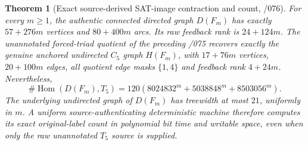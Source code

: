 \documentclass[11pt]{article}
\newtheorem{theorem}{Theorem}
\begin{document}
\begin{theorem}[Exact source-derived SAT-image contraction and count, /076]
For every $m\ge1$, the authentic connected directed graph $D(F_m)$
has exactly $57+276m$ vertices and $80+400m$ arcs.
Its raw feedback rank is $24+124m$.
The unannotated forced-triad quotient of the preceding /075
recovers exactly the genuine anchored undirected $C_5$ graph
$H(F_m)$, with $17+76m$ vertices, $20+100m$ edges,
all quotient edge masks $\{1,4\}$ and feedback rank $4+24m$.
Nevertheless,
\[
 \boxed{
 \#\operatorname{Hom}(D(F_m),T_5)
 =120\left(8024832^m+5038848^m+8503056^m\right).}
\]
The underlying undirected graph of $D(F_m)$ has treewidth at most
$21$, uniformly in $m$. A uniform source-authenticating deterministic
machine therefore computes its exact original-label count in
polynomial bit time and writable space, even when only the raw
unannotated $T_5$ source is supplied.
\end{theorem}
\end{document}

